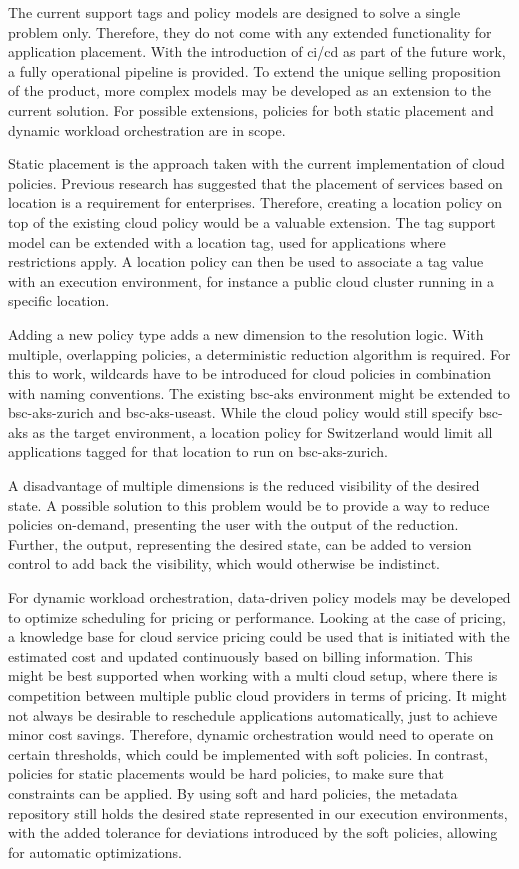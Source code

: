 \documentclass[../main.tex]{subfiles}
\begin{document}
    The current support tags and policy models are designed to solve a single problem only.
    Therefore, they do not come with any extended functionality for application placement.
    With the introduction of \acrshort{ci}/\acrshort{cd} as part of the future work, a fully operational pipeline is provided.
    To extend the unique selling proposition of the product, more complex models may be developed as an extension to the current solution.
    For possible extensions, policies for both static placement and dynamic workload orchestration are in scope.

    Static placement is the approach taken with the current implementation of cloud policies.
    Previous research has suggested that the placement of services based on location is a requirement for enterprises\cite{policy_hc_deploy}.
    Therefore, creating a location policy on top of the existing cloud policy would be a valuable extension.
    The tag support model can be extended with a location tag, used for applications where restrictions apply.
    A location policy can then be used to associate a tag value with an execution environment, for instance a public cloud cluster running in a specific location.

    Adding a new policy type adds a new dimension to the resolution logic.
    With multiple, overlapping policies, a deterministic reduction algorithm is required.
    For this to work, wildcards have to be introduced for cloud policies in combination with naming conventions.
    The existing bsc-aks environment might be extended to bsc-aks-zurich and bsc-aks-useast.
    While the cloud policy would still specify bsc-aks as the target environment, a location policy for Switzerland would limit all applications tagged for that location to run on bsc-aks-zurich.

    A disadvantage of multiple dimensions is the reduced visibility of the desired state.
    A possible solution to this problem would be to provide a way to reduce policies on-demand, presenting the user with the output of the reduction.
    Further, the output, representing the desired state, can be added to version control to add back the visibility, which would otherwise be indistinct.

    For dynamic workload orchestration, data-driven policy models may be developed to optimize scheduling for pricing or performance.
    Looking at the case of pricing, a knowledge base for cloud service pricing could be used that is initiated with the estimated cost and updated continuously based on billing information.
    This might be best supported when working with a multi cloud setup, where there is competition between multiple public cloud providers in terms of pricing.
    It might not always be desirable to reschedule applications automatically, just to achieve minor cost savings.
    Therefore, dynamic orchestration would need to operate on certain thresholds, which could be implemented with soft policies.
    In contrast, policies for static placements would be hard policies, to make sure that constraints can be applied.
    By using soft and hard policies, the metadata repository still holds the desired state represented in our execution environments, with the added tolerance for deviations introduced by the soft policies, allowing for automatic optimizations.
\end{document}
